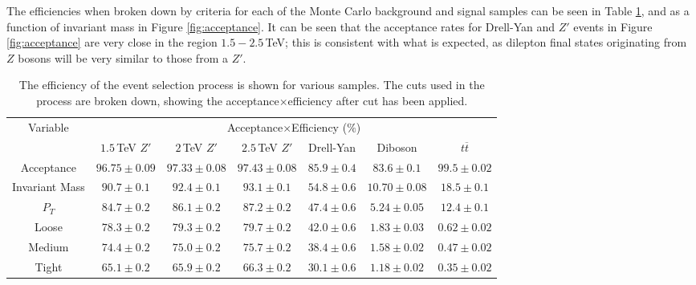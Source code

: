 \documentclass{article}
\begin{document}
The efficiencies when broken down by criteria for each of the Monte Carlo background and signal samples can be seen in Table \ref{table:selectionEfficiency}, and as a function of invariant mass in Figure \ref{fig:acceptance}. It can be seen that the acceptance rates for Drell-Yan and $Z'$ events in Figure \ref{fig:acceptance} are very close in the region $1.5-2.5\,$TeV; this is consistent with what is expected, as dilepton final states originating from $Z$ bosons will be very similar to those from a $Z'$.

\begin{table}[h!t]
\caption{The efficiency of the event selection process is shown for various samples. The cuts used in the process are broken down, showing the acceptance$\times$efficiency after cut has been applied. \label{table:selectionEfficiency}}
\begin{tabular}{|c|c|c|c|c|c|c| } 
\hline
\multirow{2}{*}{Variable}  & \multicolumn{6}{|c|}{Acceptance$\times$Efficiency ($\%$)}\\\cline{2-7}
& $1.5\,$TeV $Z'$ & $2\,$TeV $Z'$ & $2.5\,$TeV $Z'$ & Drell-Yan & Diboson & $t\overline{t}$ \\\hline
Acceptance &	$96.75\pm0.09$ & 	$97.33\pm0.08$ & 	$97.43\pm0.08$ & 	$85.9\pm0.4$ & 	$83.6\pm0.1$ & 	$99.5\pm0.02$	\\\hline
Invariant Mass &	$90.7\pm0.1$ & 	$92.4\pm0.1$ & 	$93.1\pm0.1$ & 	$54.8\pm0.6$ & 	$10.70\pm0.08$ & 	$18.5\pm0.1$	\\\hline
$P_T$ &	$84.7\pm0.2$ & 	$86.1\pm0.2$ & 	$87.2\pm0.2$ & 	$47.4\pm0.6$ & 	$5.24 \pm 0.05$ & 	$12.4\pm0.1$	\\\hline
Loose &	$78.3\pm0.2$ & 	$79.3\pm0.2$ & 	$79.7\pm0.2$ & 	$42.0\pm0.6$ & 	$1.83\pm0.03$ & 	$0.62\pm0.02$	\\\hline
Medium &	$74.4\pm0.2$ & 	$75.0\pm0.2$ & 	$75.7\pm0.2$ & 	$38.4\pm0.6$ & 	$1.58 \pm0.02$ & 	$0.47\pm0.02$	\\\hline
Tight &	$65.1\pm0.2$ & 	$65.9\pm0.2$ & 	$66.3\pm0.2$ & 	$30.1\pm0.6$ & 	$1.18 \pm0.02$ & 	$0.35\pm0.02$	\\\hline
\end{tabular}
\end{table}
\end{document}
